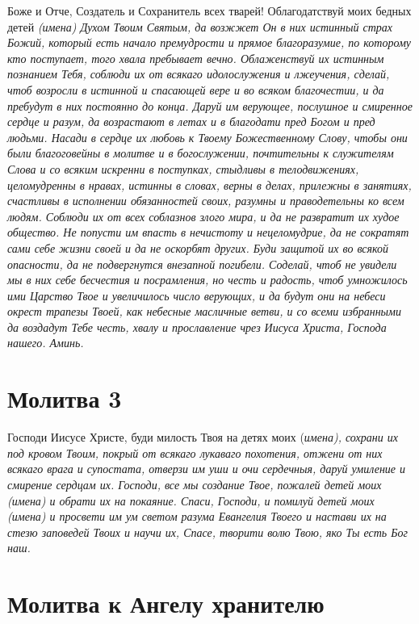 Боже и Отче, Создатель и Сохранитель всех тварей! Облагодатствуй моих бедных детей \itshape (имена)\normalfont{} Духом Твоим Святым, да возжжет Он в них истинный страх Божий, который есть начало премудрости и прямое благоразумие, по которому кто поступает, того хвала пребывает вечно. Облаженствуй их истинным познанием Тебя, соблюди их от всякаго идолослужения и лжеучения, сделай, чтоб возросли в истинной и спасающей вере и во всяком благочестии, и да пребудут в них постоянно до конца. Даруй им верующее, послушное и смиренное сердце и разум, да возрастают в летах и в благодати пред Богом и пред людьми. Насади в сердце их любовь к Твоему Божественному Слову, чтобы они были благоговейны в молитве и в богослужении, почтительны к служителям Слова и со всяким искренни в поступках, стыдливы в телодвижениях, целомудренны в нравах, истинны в словах, верны в делах, прилежны в занятиях, счастливы в исполнении обязанностей своих, разумны и праводетельны ко всем людям. Соблюди их от всех соблазнов злого мира, и да не развратит их худое общество. Не попусти им впасть в нечистоту и нецеломудрие, да не сократят сами себе жизни своей и да не оскорбят других. Буди защитой их во всякой опасности, да не подвергнутся внезапной погибели. Соделай, чтоб не увидели мы в них себе бесчестия и посрамления, но честь и радость, чтоб умножилось ими Царство Твое и увеличилось число верующих, и да будут они на небеси окрест трапезы Твоей, как небесные масличные ветви, и со всеми избранными да воздадут Тебе честь, хвалу и прославление чрез Иисуса Христа, Господа нашего. Аминь.


\section{Молитва 3}
 


Господи Иисусе Христе, буди милость Твоя на детях моих (\itshape имена\normalfont{}), сохрани их под кровом Твоим, покрый от всякаго лукаваго похотения, отжени от них всякаго врага и супостата, отверзи им уши и очи сердечныя, даруй умиление и смирение сердцам их. Господи, все мы создание Твое, пожалей детей моих (\itshape имена\normalfont{}) и обрати их на покаяние. Спаси, Господи, и помилуй детей моих (\itshape имена\normalfont{}) и просвети им ум светом разума Евангелия Твоего и настави их на стезю заповедей Твоих и научи их, Спасе, творити волю Твою, яко Ты есть Бог наш.


\section{Молитва к Ангелу хранителю}
 





